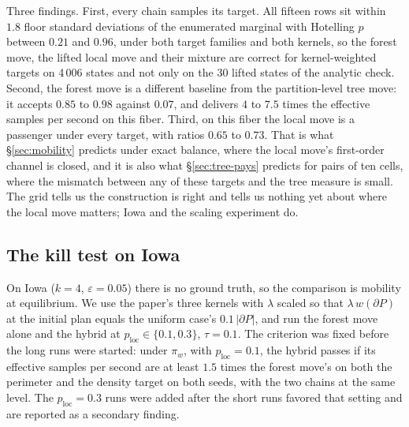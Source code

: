 \documentclass[11pt]{article}
\begin{document}
Three findings. First, every chain samples its target. All fifteen
rows sit within $1.8$ floor standard deviations of the enumerated
marginal with Hotelling $p$ between $0.21$ and $0.96$, under both
target families and both kernels, so the forest move, the lifted
local move and their mixture are correct for kernel-weighted targets
on 4\,006 states and not only on the 30 lifted states of the analytic
check. Second, the forest move is a different baseline from the
partition-level tree move: it accepts $0.85$ to $0.98$ against $0.07$,
and delivers $4$ to $7.5$ times the effective samples per second on
this fiber. Third, on this fiber the local move is a passenger under
every target, with ratios $0.65$ to $0.73$. That is what
\S\ref{sec:mobility} predicts under exact balance, where the local
move's first-order channel is closed, and it is also what
\S\ref{sec:tree-pays} predicts for pairs of ten cells, where the
mismatch between any of these targets and the tree measure is small.
The grid tells us the construction is right and tells us nothing yet
about where the local move matters; Iowa and the scaling experiment
do.

\subsection{The kill test on Iowa}\label{sec:exp-iowa}

On Iowa ($k = 4$, $\varepsilon = 0.05$) there is no ground truth, so
the comparison is mobility at equilibrium. We use the paper's three
kernels with $\lambda$ scaled so that $\lambda\, w(\partial P)$ at the
initial plan equals the uniform case's $0.1\,|\partial P|$, and run
the forest move alone and the hybrid at $p_{\mathrm{loc}} \in \{0.1,
0.3\}$, $\tau = 0.1$. The criterion was fixed before the long runs
were started: under $\pi_w$, with $p_{\mathrm{loc}} = 0.1$, the hybrid
passes if its effective samples per second are at least $1.5$ times
the forest move's on both the perimeter and the density target on
both seeds, with the two chains at the same level. The
$p_{\mathrm{loc}} = 0.3$ runs were added after the short runs favored
that setting and are reported as a secondary finding.
\end{document}
